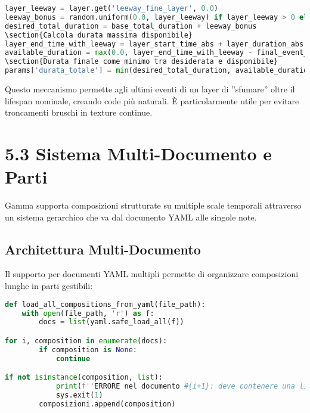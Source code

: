 \begin{lstlisting}[language=Python]
layer_leeway = layer.get('leeway_fine_layer', 0.0)
leeway_bonus = random.uniform(0.0, layer_leeway) if layer_leeway > 0 else 0.0
desired_total_duration = base_total_duration + leeway_bonus
\section{Calcola durata massima disponibile}
layer_end_time_with_leeway = layer_start_time_abs + layer_duration_abs + layer_leeway
available_duration = max(0.0, layer_end_time_with_leeway - final_event_time)
\section{Durata finale come minimo tra desiderata e disponibile}
params['durata_totale'] = min(desired_total_duration, available_duration)
\end{lstlisting}

Questo meccanismo permette agli ultimi eventi di un layer di ''sfumare'' oltre il lifespan nominale, creando code più naturali. È particolarmente utile per evitare troncamenti bruschi in texture continue.
\section{5.3 Sistema Multi-Documento e Parti}
Gamma supporta composizioni strutturate su multiple scale temporali attraverso un sistema gerarchico che va dal documento YAML alle singole note.
\subsection{Architettura Multi-Documento}
Il supporto per documenti YAML multipli permette di organizzare composizioni lunghe in parti gestibili:

\begin{lstlisting}[language=Python]
def load_all_compositions_from_yaml(file_path):
    with open(file_path, 'r') as f:
        docs = list(yaml.safe_load_all(f))

for i, composition in enumerate(docs):
        if composition is None: 
            continue

if not isinstance(composition, list):
            print(f''ERRORE nel documento #{i+1}: deve contenere una lista di sezioni.'')
            sys.exit(1)
        composizioni.append(composition)
\end{lstlisting}

